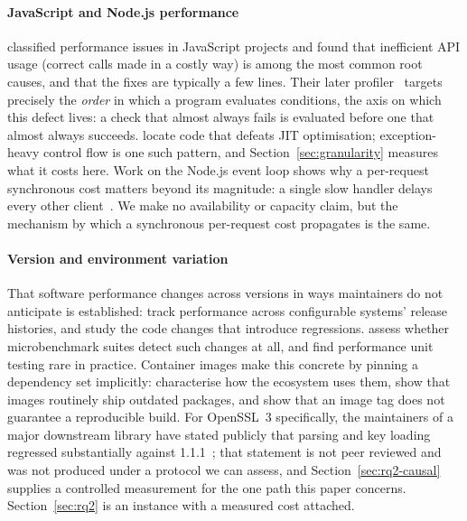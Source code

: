 \documentclass[preprint,12pt,authoryear]{elsarticle}
\begin{document}
\paragraph{JavaScript and Node.js performance} \citet{selakovic2016performance} classified performance issues in
JavaScript projects and found that inefficient API usage (correct calls made
in a costly way) is among the most common root causes, and that the fixes
are typically a few lines. Their later profiler~\citep{selakovic2017actionable}
targets precisely the \emph{order} in which a program evaluates conditions, the
axis on which this defect lives: a check that almost always fails is evaluated
before one that almost always succeeds. \citet{gong2015jitprof}
locate code that defeats JIT optimisation; exception-heavy control flow is one
such pattern, and Section~\ref{sec:granularity} measures what it costs here.
Work on the Node.js event loop shows why a per-request synchronous cost matters
beyond its magnitude: a single slow handler delays every other
client~\citep{davis2018sense,staicu2018freezing}. We make no availability or
capacity claim, but the mechanism by which a synchronous per-request cost
propagates is the same.

\paragraph{Version and environment variation} That software performance
changes across versions in ways maintainers do not anticipate is established:
\citet{kaltenecker2023performance} track performance across
configurable systems' release histories, and \citet{chen2017exploratory} study the code changes that introduce
regressions. \citet{laaber2018evaluation} assess whether
microbenchmark suites detect such changes at all, and \citet{stefan2017unit} find performance unit testing rare in practice.
Container images make this concrete by pinning a dependency set implicitly:
\citet{cito2017empirical} characterise how the ecosystem uses them,
\citet{zerouali2019outdated} show that images routinely ship
outdated packages, and \citet{malka2026docker} show that an image
tag does not guarantee a reproducible build. For OpenSSL~3 specifically, the
maintainers of a major downstream library have stated publicly that parsing and
key loading regressed substantially against 1.1.1~\citep{pyca2026stateofopenssl};
that statement is not peer reviewed and was not produced under a protocol we
can assess, and Section~\ref{sec:rq2-causal} supplies a controlled measurement
for the one path this paper concerns. Section~\ref{sec:rq2} is an instance with
a measured cost attached.
\end{document}
